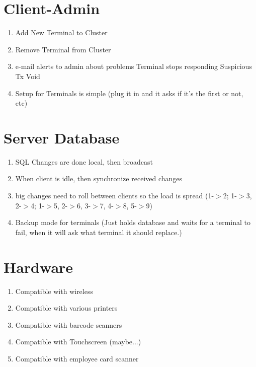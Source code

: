 \section{Client-Admin}
\begin{enumerate}
	\item Add New Terminal to Cluster
	\item Remove Terminal from Cluster
	\item e-mail alerts to admin about problems
		\subitem Terminal stops responding
		\subitem Suspicious Tx Void
	\item Setup for Terminals is simple (plug it in and it asks if it's the first or not, etc)
\end{enumerate}

\section{Server Database}
\begin{enumerate}
	\item SQL Changes are done local, then broadcast
	\item When client is idle, then synchronize received changes
	\item big changes need to roll between clients so the load is spread (1-$>$2; 1-$>$3, 2-$>$4; 1-$>$5, 2-$>$6, 3-$>$7, 4-$>$8, 5-$>$9)
	\item Backup mode for terminals (Just holds database and waits for a terminal to fail, when it will ask what terminal it should replace.)
\end{enumerate}

\section{Hardware}
\begin{enumerate}
	\item Compatible with wireless
	\item Compatible with various printers
	\item Compatible with barcode scanners
	\item Compatible with Touchscreen (maybe...)
	\item Compatible with employee card scanner
\end{enumerate}